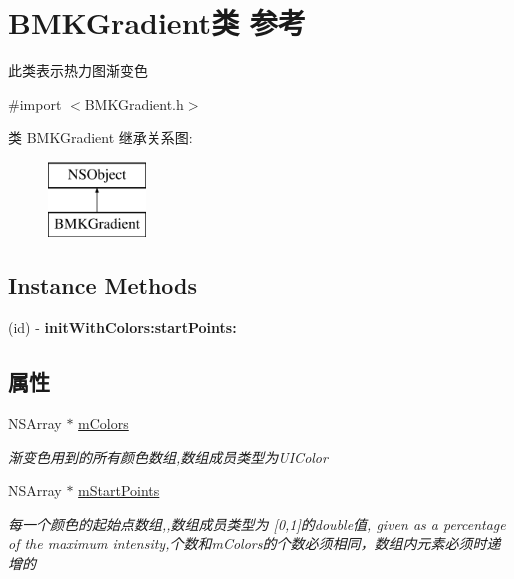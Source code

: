 \hypertarget{interface_b_m_k_gradient}{}\section{B\+M\+K\+Gradient类 参考}
\label{interface_b_m_k_gradient}


此类表示热力图渐变色  




{\ttfamily \#import $<$B\+M\+K\+Gradient.\+h$>$}

类 B\+M\+K\+Gradient 继承关系图\+:\begin{figure}[H]
\begin{center}
\leavevmode
\includegraphics[height=2.000000cm]{interface_b_m_k_gradient}
\end{center}
\end{figure}
\subsection*{Instance Methods}
\begin{DoxyCompactItemize}
\item 
\hypertarget{interface_b_m_k_gradient_af4c887250c744cdfb9f472846449d05b}{}(id) -\/ {\bfseries init\+With\+Colors\+:start\+Points\+:}\label{interface_b_m_k_gradient_af4c887250c744cdfb9f472846449d05b}

\end{DoxyCompactItemize}
\subsection*{属性}
\begin{DoxyCompactItemize}
\item 
\hypertarget{interface_b_m_k_gradient_a74426351e0f774b497b5bc6848c4c97e}{}N\+S\+Array $\ast$ \hyperlink{interface_b_m_k_gradient_a74426351e0f774b497b5bc6848c4c97e}{m\+Colors}\label{interface_b_m_k_gradient_a74426351e0f774b497b5bc6848c4c97e}

\begin{DoxyCompactList}\small\item\em 渐变色用到的所有颜色数组,数组成员类型为\+U\+I\+Color \end{DoxyCompactList}\item 
\hypertarget{interface_b_m_k_gradient_aa26241e329d659f2cadcf2452a7371c6}{}N\+S\+Array $\ast$ \hyperlink{interface_b_m_k_gradient_aa26241e329d659f2cadcf2452a7371c6}{m\+Start\+Points}\label{interface_b_m_k_gradient_aa26241e329d659f2cadcf2452a7371c6}

\begin{DoxyCompactList}\small\item\em 每一个颜色的起始点数组,,数组成员类型为 \mbox{[}0,1\mbox{]}的double值, given as a percentage of the maximum intensity,个数和m\+Colors的个数必须相同，数组内元素必须时递增的 \end{DoxyCompactList}\end{DoxyCompactItemize}


